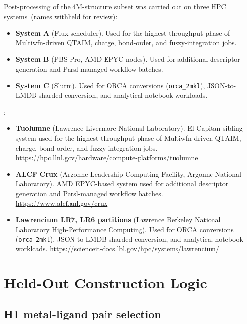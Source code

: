 Post-processing of the 4M-structure subset was carried out on
three HPC systems\ifanon\ (names withheld for review):

\begin{itemize}
  \item \textbf{System A} (Flux scheduler). Used for the highest-throughput phase of
    Multiwfn-driven QTAIM, charge, bond-order, and fuzzy-integration jobs.
  \item \textbf{System B} (PBS Pro, AMD EPYC nodes). Used for additional descriptor
    generation and Parsl-managed workflow batches.
  \item \textbf{System C} (Slurm). Used for ORCA conversions (\texttt{orca\_2mkl}),
    JSON-to-LMDB sharded conversion, and analytical notebook workloads.
\end{itemize}
\else:

\begin{itemize}
  \item \textbf{Tuolumne} (Lawrence Livermore National Laboratory). El Capitan
    sibling system used for the highest-throughput phase of Multiwfn-driven
    QTAIM, charge, bond-order, and fuzzy-integration jobs.
    \url{https://hpc.llnl.gov/hardware/compute-platforms/tuolumne}
  \item \textbf{ALCF Crux} (Argonne Leadership Computing Facility, Argonne
    National Laboratory). AMD EPYC-based system used for additional
    descriptor generation and Parsl-managed workflow batches.
    \url{https://www.alcf.anl.gov/crux}
  \item \textbf{Lawrencium LR7, LR6 partitions} (Lawrence Berkeley National
    Laboratory High-Performance Computing). Used for ORCA conversions
    (\texttt{orca\_2mkl}), JSON-to-LMDB sharded conversion, and analytical
    notebook workloads.
    \url{https://scienceit-docs.lbl.gov/hpc/systems/lawrencium/}
\end{itemize}
\fi


\section{Held-Out Construction Logic}
\label{app:heldout}

\subsection{H1 metal-ligand pair selection}
\label{app:heldout-h1}

